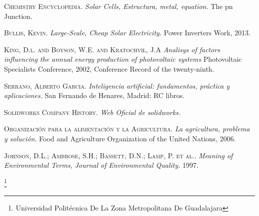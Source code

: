 \documentclass[11pt,a4paper]{article}
\begin{document}

\begin{thebibliography}{X}

 \textsc{Chemistry Encyclopedia.} \textit{Solar Cells, Estructura, metal, equation.} The pn Junction.

 \textsc{Bullis, Kevin.} \textit{Large-Scale, Cheap Solar Electricity.} 
Power Inverters Work, 2013.


 \textsc{King, D.l. and Boyson, W.E. and Kratochvil, J.A} \textit{Analisys of factors influencing the annual energy production of photovoltaic systems} 
Photovoltaic Specialists Conference, 2002, Conference Record of the twenty-ninth.

 \textsc{Serrano, Alberto Garcia.} \textit{Inteligencia artificial: fundamentos, práctica y aplicaciones.} 
San Fernando de Henares, Madrid: RC libros.

 \textsc{Solidworks Company History.} \textit{Web Oficial de solidworks.} 

 \textsc{Organización para la alimentación y la Agricultura.} \textit{La agricultura, problema y solución.} 
Food and Agriculture Organization of the United Nations, 2006.

 \textsc{Johnson, D.L.; Ambrose, S.H.; Bassett, D.N.; Lamp, P. et al..} \textit{Meaning of Environmental Terms, Journal of Environmental Quality.} 
1997.

\end{thebibliography}




 \footnote{Universidad Politécnica De La Zona Metropolitana De Guadalajara} 
\newpage
\end{document}
